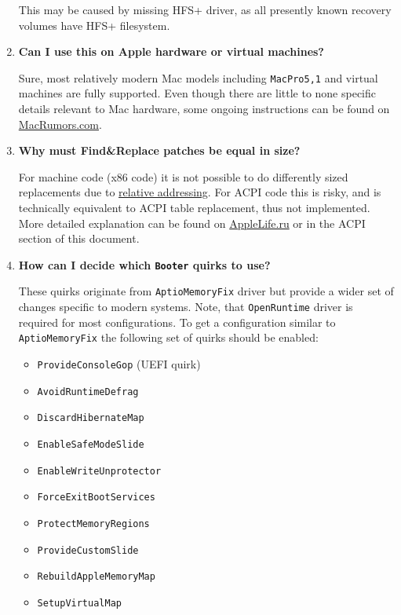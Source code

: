 \documentclass[]{article}
\providecommand{\tightlist}{%
  \setlength{\itemsep}{0pt}\setlength{\parskip}{0pt}}
\begin{document}
\begin{enumerate}
  This may be caused by missing HFS+ driver, as all presently known recovery volumes
  have HFS+ filesystem.

\item
  \textbf{Can I use this on Apple hardware or virtual machines?}

  Sure, most relatively modern Mac models including \texttt{MacPro5,1} and virtual machines
  are fully supported. Even though there are little to none specific details relevant to
  Mac hardware, some ongoing instructions can be found on
  \href{https://forums.macrumors.com/threads/opencore-on-the-mac-pro.2207814}{MacRumors.com}.

\item
  \textbf{Why must Find\&Replace patches be equal in size?}

  For machine code (x86 code) it is not possible to do differently sized replacements due to
  \href{https://en.wikipedia.org/w/index.php?title=Relative_addressing}{relative addressing}.
  For ACPI code this is risky, and is technically equivalent to ACPI table replacement,
  thus not implemented. More detailed explanation can be found on
  \href{https://applelife.ru/posts/819790}{AppleLife.ru} or in the ACPI section of this document.

\item
  \textbf{How can I decide which \texttt{Booter} quirks to use?}

  These quirks originate from \texttt{AptioMemoryFix} driver but provide a wider
  set of changes specific to modern systems. Note, that \texttt{OpenRuntime}
  driver is required for most configurations. To get a configuration similar
  to \texttt{AptioMemoryFix} the following set of quirks should be enabled:
  \begin{itemize}
  \tightlist
  \item \texttt{ProvideConsoleGop} (UEFI quirk)
  \item \texttt{AvoidRuntimeDefrag}
  \item \texttt{DiscardHibernateMap}
  \item \texttt{EnableSafeModeSlide}
  \item \texttt{EnableWriteUnprotector}
  \item \texttt{ForceExitBootServices}
  \item \texttt{ProtectMemoryRegions}
  \item \texttt{ProvideCustomSlide}
  \item \texttt{RebuildAppleMemoryMap}
  \item \texttt{SetupVirtualMap}
  \end{itemize}


\end{enumerate}
\end{document}
